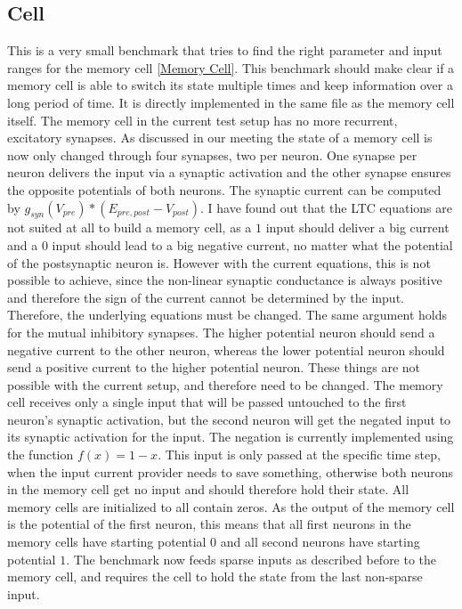 \documentclass[draft,final]{vutinfth} %
\begin{document}
    \subsection{Cell}
    This is a very small benchmark that tries to find the right parameter and input ranges for the memory cell \ref{Memory Cell}.
    This benchmark should make clear if a memory cell is able to switch its state multiple times and keep information over a long period of time.
    It is directly implemented in the same file as the memory cell itself.
    The memory cell in the current test setup has no more recurrent, excitatory synapses.
    As discussed in our meeting the state of a memory cell is now only changed through four synapses, two per neuron.
    One synapse per neuron delivers the input via a synaptic activation and the other synapse ensures the opposite potentials of both neurons.
    The synaptic current can be computed by $g_{syn}(V_{pre}) * (E_{pre,post} - V_{post})$.
    I have found out that the LTC equations are not suited at all to build a memory cell, as a $1$ input should deliver a big current and a $0$ input should lead to a big negative current, no matter what the potential of the postsynaptic neuron is.
    However with the current equations, this is not possible to achieve, since the non-linear synaptic conductance is always positive and therefore the sign of the current cannot be determined by the input.
    Therefore, the underlying equations must be changed.
    The same argument holds for the mutual inhibitory synapses. The higher potential neuron should send a negative current to the other neuron, whereas the lower potential neuron should send a positive current to the higher potential neuron.
    These things are not possible with the current setup, and therefore need to be changed.
    The memory cell receives only a single input that will be passed untouched to the first neuron's synaptic activation, but the second neuron will get the negated input to its synaptic activation for the input.
    The negation is currently implemented using the function $f(x) = 1-x$.
    This input is only passed at the specific time step, when the input current provider needs to save something, otherwise both neurons in the memory cell get no input and should therefore hold their state.
    All memory cells are initialized to all contain zeros.
    As the output of the memory cell is the potential of the first neuron, this means that all first neurons in the memory cells have starting potential $0$ and all second neurons have starting potential $1$.
    The benchmark now feeds sparse inputs as described before to the memory cell, and requires the cell to hold the state from the last non-sparse input.
\end{document}
